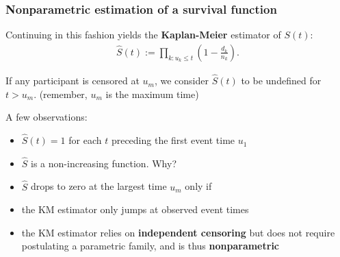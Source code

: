 \documentclass[12pt, 
hyperref={colorlinks=true, linkcolor=blue, urlcolor=cyan},dvipsnames]{beamer}
\begin{document}
\begin{frame}
\frametitle{Nonparametric estimation of a survival function}
Continuing in this fashion yields the \textbf{Kaplan-Meier} estimator of $S(t)$: \vspace{-0.3cm}
\begin{align*}
\widehat{S}(t) := \prod_{k: u_k \leq t} \left(1 - \frac{d_k}{n_k} \right).
\end{align*}\vspace{-0.5cm}

If any participant is censored at $u_m$, we consider $\widehat{S}(t)$ to be undefined for $t > u_m$. (remember, $u_m$ is the maximum time)

A few observations:
\begin{itemize}
\item $\widehat{S}(t) = 1$ for each $t$ preceding the first event time $u_1$ \pause
\item $\widehat{S}$ is a non-increasing function. Why? \pause
\item $\widehat{S}$ drops to zero at the largest time $u_m$ only if \underline{\;\;\;\;\phantom{right}\;\;\;} \pause
\item the KM estimator only jumps at observed event times \pause
\item the KM estimator relies on \textbf{independent censoring} but does not require postulating a parametric family, and is thus \textbf{nonparametric}
\end{itemize}
\end{frame}
\end{document}
